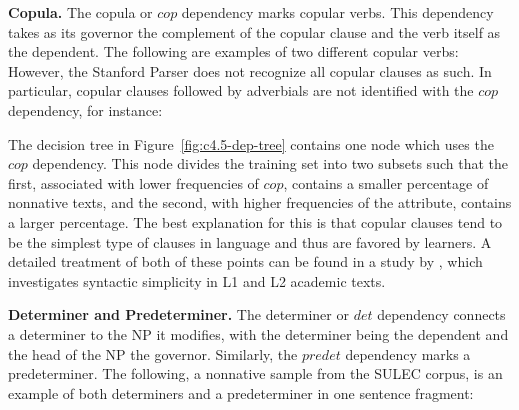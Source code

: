 \documentclass[main.tex]{subfiles}
\begin{document}

\textbf{Copula.} The copula or $cop$ dependency marks copular verbs. This dependency takes as its governor the complement of the copular clause and the verb itself as the dependent. The following \citep[pp. 52-3]{quirk:1985} are examples of two different copular verbs:
However, the Stanford Parser does not recognize all copular clauses as such. In particular, copular clauses followed by adverbials are not identified with the $cop$ dependency, for instance:

The decision tree in Figure~\ref{fig:c4.5-dep-tree} contains one node which uses the $cop$ dependency. This node divides the training set into two subsets such that the first, associated with lower frequencies of $cop$, contains a smaller percentage of nonnative texts, and the second, with higher frequencies of the attribute, contains a larger percentage. The best explanation for this is that copular clauses tend to be the simplest type of clauses in language and thus are favored by learners. A detailed treatment of both of these points can be found in a study by \citet{hinkel:2003}, which investigates syntactic simplicity in L1 and L2 academic texts.


\textbf{Determiner and Predeterminer.} The determiner or $det$ dependency connects a determiner to the NP it modifies, with the determiner being the dependent and the head of the NP the governor. Similarly, the $predet$ dependency marks a predeterminer. The following, a nonnative sample from the SULEC corpus, is an example of both determiners and a predeterminer in one sentence fragment: 
\end{document}
